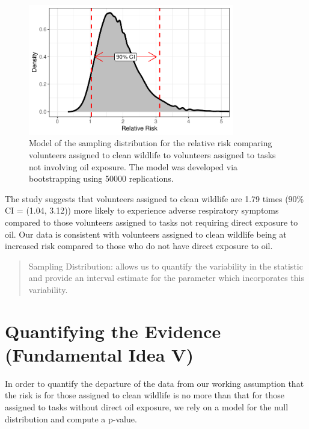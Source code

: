\documentclass[
  letterpaper,
  DIV=11,
  numbers=noendperiod]{scrreprt}
\theoremstyle{definition}
\theoremstyle{definition}
\theoremstyle{plain}
\theoremstyle{remark}
\begin{document}
\begin{figure}

{\centering \includegraphics[width=0.8\textwidth,height=\textheight]{./images/fig-recaplanguage-sampling-distribution-1.pdf}

}

\caption{\label{fig-recaplanguage-sampling-distribution}Model of the
sampling distribution for the relative risk comparing volunteers
assigned to clean wildlife to volunteers assigned to tasks not involving
oil exposure. The model was developed via bootstrapping using 50000
replications.}

\end{figure}

The study suggests that volunteers assigned to clean wildlife are 1.79
times (90\% CI = (1.04, 3.12)) more likely to experience adverse
respiratory symptoms compared to those volunteers assigned to tasks not
requiring direct exposure to oil. Our data is consistent with volunteers
assigned to clean wildlife being at increased risk compared to those who
do not have direct exposure to oil.

\begin{quote}
Sampling Distribution: allows us to quantify the variability in the
statistic and provide an interval estimate for the parameter which
incorporates this variability.
\end{quote}

\hypertarget{quantifying-the-evidence-fundamental-idea-v}{%
\section{Quantifying the Evidence (Fundamental Idea
V)}\label{quantifying-the-evidence-fundamental-idea-v}}

In order to quantify the departure of the data from our working
assumption that the risk is for those assigned to clean wildlife is no
more than that for those assigned to tasks without direct oil exposure,
we rely on a model for the null distribution and compute a p-value.
\end{document}
